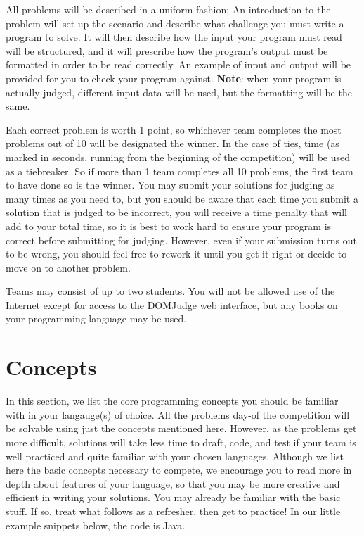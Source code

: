 \documentclass[a4paper]{article}
\begin{document}
All problems will be described in a uniform fashion: An introduction to the problem will set up the scenario and describe what challenge you must write a program to solve. It will then describe how the input your program must read will be structured, and it will prescribe how the program's output must be formatted in order to be read correctly. An example of input and output will be provided for you to check your program against. \textbf{Note}: when your program is actually judged, different input data will be used, but the formatting will be the same. 

Each correct problem is worth 1 point, so whichever team completes the most problems out of 10 will be designated the winner. In the case of ties, time (as marked in seconds, running from the beginning of the competition) will be used as a tiebreaker. So if more than 1 team completes all 10 problems, the first team to have done so is the winner. You may submit your solutions for judging as many times as you need to, but you should be aware that each time you submit a solution that is judged to be incorrect, you will receive a time penalty that will add to your total time, so it is best to work hard to ensure your program is correct before submitting for judging. However, even if your submission turns out to be wrong, you should feel free to rework it until you get it right or decide to move on to another problem. 

Teams may consist of up to two students. You will not be allowed use of the Internet except for access to the DOMJudge web interface, but any books on your programming language may be used. 

\newpage

\section{Concepts}

In this section, we list the core programming concepts you should be familiar with in your langauge(s) of choice. All the problems day-of the competition will be solvable using just the concepts mentioned here. However, as the problems get more difficult, solutions will take less time to draft, code, and test if your team is well practiced and quite familiar with your chosen languages. Although we list here the basic concepts necessary to compete, we encourage you to read more in depth about features of your language, so that you may be more creative and efficient in writing your solutions. You may already be familiar with the basic stuff. If so, treat what follows as a refresher, then get to practice! In our little example snippets below, the code is Java.
\end{document}
